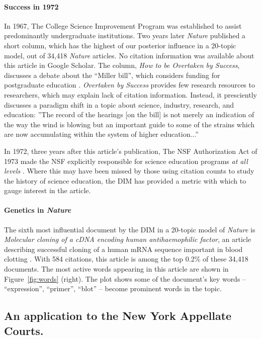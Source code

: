 \paragraph{Success in 1972}
In 1967, The College Science Improvement Program was established to
assist predominantly undergraduate institutions.  Two years later
\emph{Nature} published a short column, which has the highest of our
posterior influence in a 20-topic model, out of 34,418 \emph{Nature}
articles.  No citation information was available about this article in
Google Scholar. The column, \emph{How to be Overtaken by Success},
discusses a debate about the ``Miller bill'', which considers funding
for postgraduate education
\cite{Nature.success:1969}. \textit{Overtaken by Success} provides few
research resources to researchers, which may explain lack of citation
information. Instead, it presciently discusses a paradigm shift in a
topic about science, industry, research, and education: ''The record
of the hearings [on the bill] is not merely an indication of the way
the wind is blowing but an important guide to some of the strains
which are now accumulating within the system of higher education...''

In 1972, three years after this article's publication, The NSF
Authorization Act of 1973 made the NSF explicitly responsible for
science education programs \emph{at all levels}
\cite{NSF.website:2010}.  Where this may have been missed by those
using citation counts to study the history of science education, the
DIM has provided a metric with which to gauge interest in the article.


\paragraph{Genetics in \emph{Nature}}
The sixth most influential document by the DIM in a 20-topic model of
\emph{Nature} is \emph{Molecular cloning of a cDNA encoding human
  antihaemophilic factor}, an article describing successful
cloning of a human mRNA sequence important in blood clotting
\cite{toole:1984}.  With 584 citations, this article is among the top
0.2\% of these 34,418 documents.  The most active words
appearing in this article are shown in
Figure~\ref{fig:words} (right).  The plot shows some of the
document's key words -- ``expression'', ``primer'', ``blot'' -- become
prominent words in the topic.

\subsection{An application to the New York Appellate Courts.}

